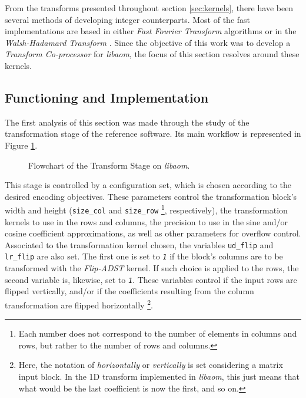 From the transforms presented throughout section \ref{sec:kernels}, there have been several methods of developing integer counterparts. Most of the fast implementations are based in either \emph{Fast Fourier Transform} algorithms or in the \emph{Walsh-Hadamard Transform} \cite{wolterParallelArchitecturesDiscrete1992,yonghongzengIntegerDCTsFast2001}. Since the objective of this work was to develop a \emph{Transform Co-processor} for \emph{libaom}, the focus of this section resolves around these kernels. 

\subsection{Functioning and Implementation}

The first analysis of this section was made through the study of the transformation stage of the reference software. Its main workflow is represented in Figure \ref{fig:libtrans}.

\begin{figure}[!htbp]
    \centering
    
    \caption{Flowchart of the Transform Stage on \emph{libaom}.}
    \label{fig:libtrans}
\end{figure}

This stage is controlled by a configuration set, which is chosen according to the desired encoding objectives. These parameters control the transformation block's width and height (\texttt{size\_col} and \texttt{size\_row} \footnote{Each number does not correspond to the number of elements in columns and rows, but rather to the number of rows and columns.}, respectively), the transformation kernels to use in the rows and columns, the precision to use in the sine and/or cosine coefficient approximations, as well as other parameters for overflow control. Associated to the transformation kernel chosen, the variables \texttt{ud\_flip} and \texttt{lr\_flip} are also set. The first one is set to \emph{\texttt{1}} if the block's columns are to be transformed with the \emph{Flip-ADST} kernel. If such choice is applied to the rows, the second variable is, likewise, set to \emph{\texttt{1}}. These variables control if the input rows are flipped vertically, and/or if the coefficients resulting from the column transformation are flipped horizontally \footnote{Here, the notation of \emph{horizontally} or \emph{vertically} is set considering a matrix input block. In the 1D transform implemented in \emph{libaom}, this just means that what would be the last coefficient is now the first, and so on.}.

